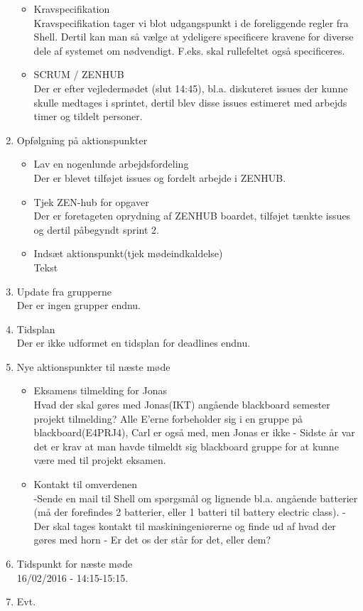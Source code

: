 \begin{enumerate}
\begin{itemize}
			\item Kravspecifikation\\
			Kravspecifikation tager vi blot udgangspunkt i de foreliggende regler fra Shell. Dertil kan man så vælge at ydeligere specificere kravene for diverse dele af systemet om nødvendigt. F.eks. skal rullefeltet også specificeres. 
			
			\item SCRUM / ZENHUB\\
			Der er efter vejledermødet (slut 14:45), bl.a. diskuteret issues der kunne skulle medtages i sprintet, dertil blev disse issues estimeret med arbejds timer og tildelt personer.
		\end{itemize}
			
		\item Opfølgning på aktionspunkter
		\begin{itemize}
			\itemsep 0.3em 
			\item Lav en nogenlunde arbejdsfordeling\\
				Der er blevet tilføjet issues og fordelt arbejde i ZENHUB.
			\item Tjek ZEN-hub for opgaver\\
				Der er foretageten oprydning af ZENHUB boardet, tilføjet tænkte issues og dertil påbegyndt sprint 2.
			\item Indsæt aktionspunkt(tjek mødeindkaldelse)\\
				Tekst
		\end{itemize}
		\item Update fra grupperne\\
			Der er ingen grupper endnu.
		\item Tidsplan\\
			Der er ikke udformet en tidsplan for deadlines endnu. 
			
		\item Nye aktionspunkter til næste møde\\
		\begin{itemize}
			\itemsep 0.3em 
		\item Eksamens tilmelding for Jonas\\
		Hvad der skal gøres med Jonas(IKT) angående blackboard semester projekt tilmelding? Alle E'erne forbeholder sig i en gruppe på blackboard(E4PRJ4), Carl er også med, men Jonas er ikke - Sidste år var det er krav at man havde tilmeldt sig blackboard gruppe for at kunne være med til projekt eksamen.
		
		\item Kontakt til omverdenen\\
		-Sende en mail til Shell om spørgsmål og lignende bl.a. angående batterier (må der forefindes 2 batterier, eller 1 batteri til battery electric class).  
		-Der skal tages kontakt til maskiningeniørerne og finde ud af hvad der gøres med horn - Er det os der står for det, eller dem?
		\end{itemize}
		
		\item Tidspunkt for næste møde\\
			16/02/2016 - 14:15-15:15.
		\item Evt.
	\end{enumerate}
